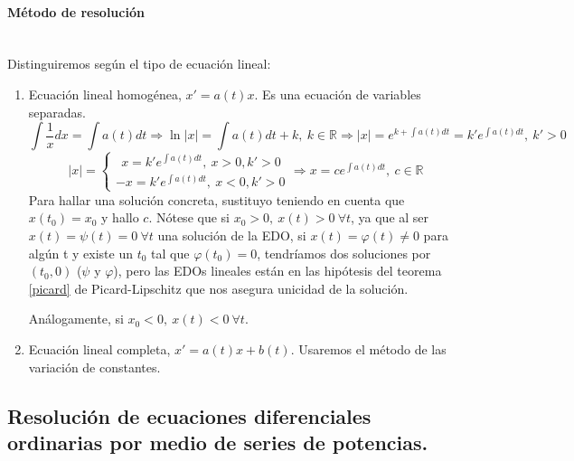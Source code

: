 \documentclass{article}
\providecommand{\abs}[1]{\lvert#1\rvert}
\theoremstyle{theorem-style}  %
\theoremstyle{definition-style}
\theoremstyle{example-style}
\begin{document}
\begin{enumerate}[\quad i)]
\paragraph{Método de resolución} \ \\
Distinguiremos según el tipo de ecuación lineal:
\begin{enumerate}[\quad i)]
	\item Ecuación lineal homogénea, $ x'=a(t)x $. Es una ecuación de variables separadas.
	\[ \int\frac{1}{x}dx=\int a(t)dt\Rightarrow\ln\abs{x}=\int a(t)dt+k, \ k\in\mathbb{R}\Rightarrow\abs{x}=e^{k+\int a(t)dt}=k'e^{\int a(t)dt}, \ k'>0 \]
	\[ \abs{x}=\begin{cases}
	\ \ x=k'e^{\int a(t)dt}, \ x>0, k'>0\\
	-x=k'e^{\int a(t)dt}, \ x<0, k'>0
	\end{cases}\Rightarrow x=ce^{\int a(t)dt}, \ c\in \mathbb{R}  \]
	Para hallar una solución concreta, sustituyo teniendo en cuenta que $ x(t_0)=x_0 $ y hallo $ c $. Nótese que si $ x_0>0,\ x(t)>0\ \forall t $, ya que al ser $ x(t)= \psi(t)=0 \ \forall t$ una solución de la EDO, si $ x(t)= \varphi(t)\neq0 $ para algún t y existe un $ t_0 $ tal que $ \varphi(t_0)=0 $, tendríamos dos soluciones por $ (t_0,0) $ ($ \psi $ y $ \varphi $), pero las EDOs lineales están en las hipótesis del teorema \ref{picard} de Picard-Lipschitz que nos asegura unicidad de la solución.
	
	Análogamente, si $ x_0<0,\ x(t)<0\ \forall t $.
	\item Ecuación lineal completa, $ x'=a(t)x +b(t) $. Usaremos el método de las variación de constantes.
\end{enumerate}
	
\end{enumerate}

\subsection{Resolución de ecuaciones diferenciales ordinarias por medio de series de potencias.}

\pagebreak
\end{document}
